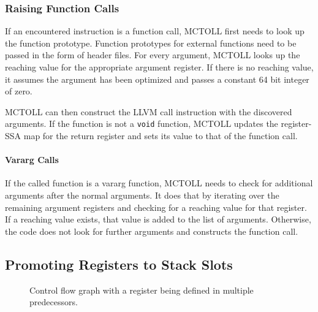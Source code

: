 \subsubsection{Raising Function Calls}\label{subsubsec:raising-function-calls}

If an encountered instruction is a function call, MCTOLL first needs to look up the function prototype.
Function prototypes for external functions need to be passed in the form of header files.
For every argument, MCTOLL looks up the reaching value for the appropriate argument register.
If there is no reaching value, it assumes the argument has been optimized and passes a constant 64 bit integer of zero.

MCTOLL can then construct the LLVM call instruction with the discovered arguments.
If the function is not a \texttt{void} function, MCTOLL updates the register-SSA map for the return register and sets its value to that of the function call.

\paragraph{Vararg Calls}
If the called function is a vararg function, MCTOLL needs to check for additional arguments after the normal arguments.
It does that by iterating over the remaining argument registers and checking for a reaching value for that register.
If a reaching value exists, that value is added to the list of arguments.
Otherwise, the code does not look for further arguments and constructs the function call.

\subsection{Promoting Registers to Stack Slots}\label{subsec:promoting-registers-to-stack-slots}

\begin{figure}[htpb]
    \centering
    \caption{Control flow graph with a register being defined in multiple predecessors.}
    \label{fig:mctoll-cfg-regs}
\end{figure}

